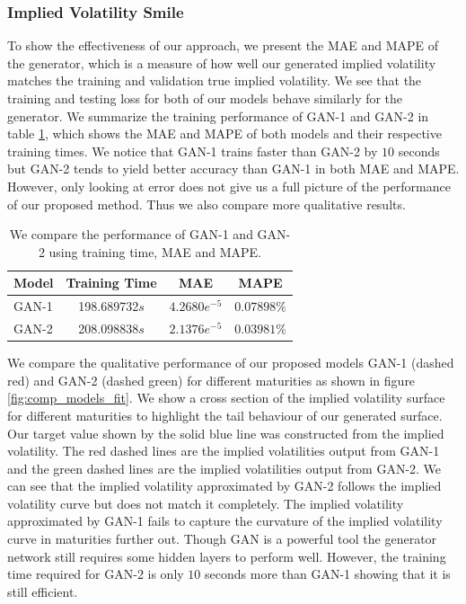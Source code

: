 \documentclass{article}
\theoremstyle{plain}%
\theoremstyle{definition}
\theoremstyle{remark}
\begin{document}
\subsubsection{Implied Volatility Smile}
To show the effectiveness of our approach, we present the MAE and MAPE of the generator, which is a measure of how well our generated implied volatility matches the training and validation true implied volatility. We see that the training and testing loss for both of our models behave similarly for the generator. We summarize the training performance of GAN-1 and GAN-2 in table {\ref{tab:final_model_performance}}, which shows the MAE and MAPE of both models and their respective training times. We notice that GAN-1 trains faster than GAN-2 by $10$ seconds but GAN-2 tends to yield better accuracy than GAN-1 in both MAE and MAPE. However, only looking at error does not give us a full picture of the performance of our proposed method. Thus we also compare more qualitative results.

\begin{table}[htbp]
\centering
\caption{We compare the performance of GAN-1 and GAN-2 using training time, MAE and MAPE.}
\begin{tabular}{lccc}
\hline
\textbf{Model} & \textbf{Training Time} & \textbf{MAE} & \textbf{MAPE} \\
\hline
GAN-1 & 198.689732$s$ & $4.2680e^{-5}$ & $0.07898\%$\\
GAN-2 & 208.098838$s$ & $2.1376e^{-5}$ & $0.03981\%$\\
\hline
\end{tabular}
\label{tab:final_model_performance}
\end{table}

We compare the qualitative performance of our proposed models GAN-1 (dashed red) and GAN-2 (dashed green) for different maturities as shown in figure \ref{fig:comp_models_fit}. We show a cross section of the implied volatility surface for different maturities to highlight the tail behaviour of our generated surface. Our target value shown by the solid blue line was constructed from the implied volatility. The red dashed lines are the implied volatilities output from GAN-1 and the green dashed lines are the implied volatilities output from GAN-2. We can see that the implied volatility approximated by GAN-2 follows the implied volatility curve but does not match it completely. The implied volatility approximated by GAN-1 fails to capture the curvature of the implied volatility curve in maturities further out.  Though GAN is a powerful tool the generator network still requires some hidden layers to perform well. However, the training time required for GAN-2 is only $10$ seconds more than GAN-1 showing that it is still efficient.
\end{document}
